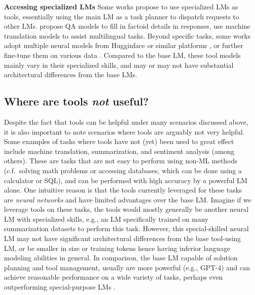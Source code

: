 \noindent \textbf{ Accessing specialized LMs} \quad
Some works propose to use specialized LMs as tools, essentially using the main LM as a task planner to dispatch requests to other LMs.
\citet{schick2023toolformer} propose QA models to fill in factoid details in responses, \citet{thoppilan2022lamda,schick2023toolformer,paranjape2023art} use machine translation models to assist multilingual tasks. Beyond specific tasks, some works adopt multiple neural models from Hugginface or similar platforms \citep{patil2023gorilla,shen2023hugginggpt}, or further fine-tune them on various data \citep{viswanathan2023prompt2model}.
Compared to the base LM, these tool models mainly vary in their specialized skills, and may or may not have substantial architectural differences from the base LMs.


\subsection{Where are tools \emph{not} useful?}
\label{sub:not-useful}

Despite the fact that tools can be helpful under many scenarios discussed above, it is also important to note scenarios where tools are arguably not very helpful.
Some examples of tasks where tools have not (yet) been used to great effect include machine translation, summarization, and sentiment analysis (among others).
These are tasks that are not easy to perform using non-ML methods (c.f.~solving math problems or accessing databases, which can be done using a calculator or SQL), and can be performed with high accuracy by a powerful LM alone.
One intuitive reason is that the tools currently leveraged for these tasks are \textit{neural networks} and have limited advantages over the base LM.
Imagine if we leverage tools on these tasks, the tools would mostly generally be another neural LM with specialized skills, e.g., an LM specifically trained on many summarization datasets to perform this task. However, this special-skilled neural LM may not have significant architectural differences from the base tool-using LM, or be smaller in size or training tokens hence having inferior language modeling abilities in general.
In comparison, the base LM capable of solution planning and tool management, usually are more powerful (e.g., GPT-4) and can achieve reasonable performance on a wide variety of tasks, perhaps even outperforming special-purpose LMs \citep{robinson-etal-2023-chatgpt}.
